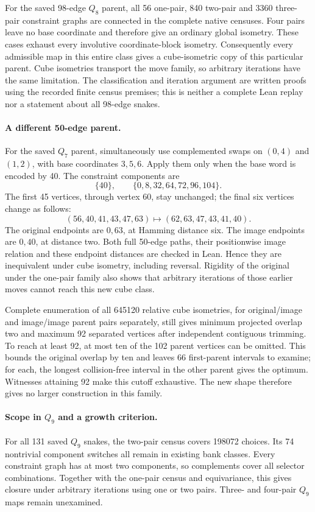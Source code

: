 \documentclass[11pt,a4paper]{article}
\theoremstyle{definition}
\theoremstyle{remark}
\begin{document}
For the saved 98-edge $Q_8$ parent, all 56 one-pair, 840 two-pair and
3360 three-pair constraint graphs are connected in the complete native
censuses. Four pairs leave no base coordinate and therefore give an
ordinary global isometry. These cases exhaust every involutive
coordinate-block isometry. Consequently every admissible map in this
entire class gives a cube-isometric copy of this particular parent.
Cube isometries transport the move family, so arbitrary iterations
have the same limitation. The classification and iteration argument
are written proofs using the recorded finite census premises; this
is neither a complete Lean replay nor a statement about all 98-edge
snakes.

\paragraph{A different 50-edge parent.}
For the saved $Q_7$ parent, simultaneously use complemented swaps on
$(0,4)$ and $(1,2)$, with base coordinates $3,5,6$. Apply them only
when the base word is encoded by 40. The constraint components are
\[
\{40\},\qquad\{0,8,32,64,72,96,104\}.
\]
The first 45 vertices, through vertex 60, stay unchanged; the final
six vertices change as follows:
\[
(56,40,41,43,47,63)\longmapsto(62,63,47,43,41,40).
\]
The original endpoints are $0,63$, at Hamming distance six. The image
endpoints are $0,40$, at distance two. Both full 50-edge paths, their
positionwise image relation and these endpoint distances are checked
in Lean. Hence they are inequivalent under cube isometry, including
reversal. Rigidity of the original under the one-pair family also
shows that arbitrary iterations of those earlier moves cannot reach
this new cube class.

Complete enumeration of all 645120 relative cube isometries, for
original/image and image/image parent pairs separately, still gives
minimum projected overlap two and maximum 92 separated vertices
after independent contiguous trimming. To reach at least 92, at most
ten of the 102 parent vertices can be omitted. This bounds the original
overlap by ten and leaves 66 first-parent intervals to examine; for
each, the longest collision-free interval in the other parent gives
the optimum. Witnesses attaining 92 make this cutoff exhaustive.
The new shape therefore gives no larger construction in this family.

\paragraph{Scope in $Q_9$ and a growth criterion.}
For all 131 saved $Q_9$ snakes, the two-pair census covers 198072 choices.
Its 74 nontrivial component switches all remain in existing bank
classes. Every constraint graph has at most two components, so
complements cover all selector combinations. Together with the
one-pair census and equivariance, this gives closure under arbitrary
iterations using one or two pairs. Three- and four-pair $Q_9$ maps
remain unexamined.
\end{document}
